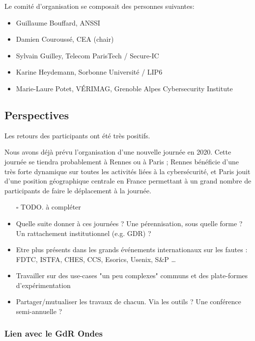 \documentclass[a4paper,11pt]{article}
\begin{document}
Le comité d'organisation se composait des personnes suivantes:

\begin{itemize}
\item Guillaume Bouffard,  ANSSI
\item Damien Couroussé, CEA  (chair)
\item Sylvain Guilley, Telecom ParisTech / Secure-IC
\item Karine Heydemann, Sorbonne Université / LIP6
\item Marie-Laure Potet, VÉRIMAG,  Grenoble Alpes Cybersecurity Institute
\end{itemize}

\subsection{Perspectives}
\label{sec:org532a8f5}

Les retours des participants ont été très positifs.

Nous avons déjà prévu l'organisation d'une nouvelle journée en 2020.
Cette journée se tiendra probablement à Rennes ou à Paris ;  Rennes
bénéficie d'une très forte dynamique sur toutes les activités liées à
la cybersécurité, et Paris jouit d'une position géographique centrale
en France permettant à un grand nombre de participants de faire le
déplacement à la journée.

\begin{itemize}
\item[{$\square$}] TODO.  à compléter

\item Quelle suite donner à ces journées ?  Une pérennisation, sous quelle
forme ?  Un rattachement institutionnel (e.g. GDR) ?
\item Etre plus présents dans les grands événements internationaux sur les
fautes : FDTC, ISTFA, CHES, CCS, Esorics, Usenix, S\&P …
\item Travailler sur des use-cases "un peu complexes" communs et des
plate-formes d’expérimentation
\item Partager/mutualiser les travaux de chacun. Via les outils ? Une
conférence semi-annuelle ?
\end{itemize}

\subsubsection{Lien avec le GdR Ondes}
\label{sec:orgee1c135}
\end{document}
